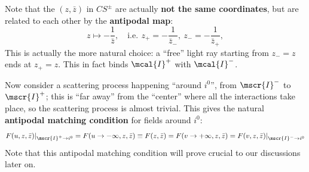 \documentclass[a4paper
	,10pt
]{article}
\begin{document}
\pagebreak[4]
	Note that the $(z,\bar{z})$ in $CS^\pm$ are actually \textbf{not the same coordinates}, but are related to each other by the \textbf{antipodal map}:
	\begin{equation}
		z \mapsto -\frac{1}{\bar{z}},
	\quad
		\text{i.e.}\,\ %
		z_+ = - \frac{1}{\bar{z}_-},
	\ %
		z_- = - \frac{1}{\bar{z}_+},
	\end{equation}
	This is actually the more natural choice: a ``free'' light ray starting from $z_- = z$ ends at $z_+ = z$. This in fact binds $\mcal{I}^+$ with $\mcal{I}^-$. 
	
	Now consider a scattering process happening ``around $i^0$'', from $\mscr{I}^-$ to $\mscr{I}^+$; this is ``far away'' from the ``center'' where all the interactions take place, so the scattering process is almost trivial. 
	This gives the natural \textbf{antipodal matching condition} for fields around $i^0$:
	\begin{equation}
		F(u,z,\bar{z})|_{\mscr{I}^+\to i^0}
		= F(u\to -\infty,z,\bar{z})
		\equiv F(z,\bar{z})
		= F(v\to +\infty,z,\bar{z})
		= F(v,z,\bar{z})|_{\mscr{I}^-\to i^0}
	\end{equation}
	Note that this antipodal matching condition will prove crucial to our discussions later on. 
\end{document}
